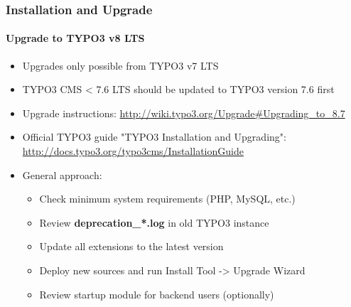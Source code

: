 \begin{frame}[fragile]
	\frametitle{Installation and Upgrade}
	\framesubtitle{Upgrade to TYPO3 v8 LTS}

	\begin{itemize}
		\item Upgrades only possible from TYPO3 v7 LTS
		\item TYPO3 CMS < 7.6 LTS should be updated to TYPO3 version 7.6 first
	\end{itemize}

	\begin{itemize}

		\item Upgrade instructions:\newline
			\smaller\url{http://wiki.typo3.org/Upgrade#Upgrading_to_8.7}\normalsize
		\item Official TYPO3 guide "TYPO3 Installation and Upgrading":
			\smaller\url{http://docs.typo3.org/typo3cms/InstallationGuide}\normalsize
		\item General approach:
			\begin{itemize}
				\item Check minimum system requirements \small(PHP, MySQL, etc.)
				\item Review \textbf{deprecation\_*.log} in old TYPO3 instance
				\item Update all extensions to the latest version
				\item Deploy new sources and run Install Tool -> Upgrade Wizard
				\item Review startup module for backend users (optionally)
			\end{itemize}
	\end{itemize}

\end{frame}

